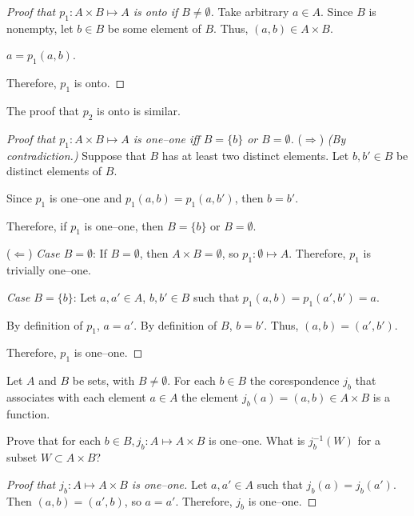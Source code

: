 
\begin{proof}[Proof that $p_1 : A \times B \mapsto A$ is onto if $B \neq \emptyset$]
	Take arbitrary $a \in A$.
	Since $B$ is nonempty, let $b \in B$ be some element of $B$.
	Thus, $(a,b) \in A \times B$.

	$a = p_1(a,b)$.

	Therefore, $p_1$ is onto.
\end{proof}
The proof that $p_2$ is onto is similar.

\begin{proof}[Proof that $p_1 : A \times B \mapsto A$ is one--one iff $B = \{b\}$ or $B = \emptyset$]
	($\Rightarrow$) \textit{(By contradiction.)}
	Suppose that $B$ has at least two distinct elements. Let $b, b' \in B$ be distinct elements of $B$.

	Since $p_1$ is one--one and $p_1(a,b) = p_1(a,b')$, then $b = b'$. \contradiction

	Therefore, if $p_1$ is one--one, then $B = \{b\}$ or $B = \emptyset$.

	($\Leftarrow$) \textit{Case $B = \emptyset$}:
	If $B = \emptyset$, then $A \times B = \emptyset$, so $p_1 : \emptyset \mapsto A$.
	Therefore, $p_1$ is trivially one--one.

	\textit{Case $B = \{b\}$}:
	Let $a,a' \in A$, $b,b' \in B$ such that $p_1(a,b) = p_1(a',b') = a$.

	By definition of $p_1$, $a = a'$. By definition of $B$, $b = b'$.
	Thus, $(a,b) = (a',b')$.

	Therefore, $p_1$ is one--one.
\end{proof}

\begin{problem}
	Let $A$ and $B$ be sets, with $B \neq \emptyset$.
	For each $b \in B$ the corespondence $j_b$ that associates with each element $a \in A$ the element $j_b(a) = (a,b) \in A \times B$ is a function.

	Prove that for each $b \in B, j_b : A \mapsto A \times B$ is one--one.
	What is $j_b^{-1}(W)$ for a subset $W \subset A \times B$?
\end{problem}

\begin{proof}[Proof that $j_b : A \mapsto A \times B$ is one--one]
	Let $a,a' \in A$ such that $j_b(a) = j_b(a')$.
	Then $(a,b) = (a',b)$, so $a = a'$.
	Therefore, $j_b$ is one--one.
\end{proof}

